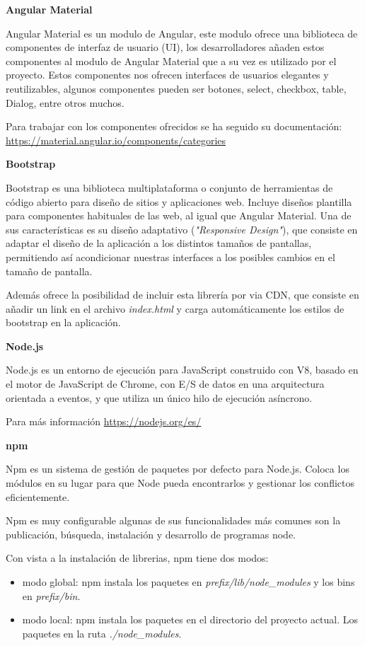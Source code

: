 \textbf{Angular Material}

Angular Material es un modulo de Angular, este modulo ofrece una biblioteca de componentes de interfaz de usuario (UI), los desarrolladores añaden estos componentes al modulo de Angular Material que a su vez es utilizado por el proyecto. Estos componentes nos  ofrecen interfaces de usuarios elegantes  y reutilizables, algunos componentes pueden ser botones, select, checkbox, table, Dialog, entre otros muchos.

Para trabajar con los componentes ofrecidos se ha seguido su documentación: \url{https://material.angular.io/components/categories}

\textbf{Bootstrap}

Bootstrap es una biblioteca multiplataforma o conjunto de herramientas de código abierto  para diseño de sitios y aplicaciones web. Incluye diseños plantilla para componentes habituales de las web, al igual que Angular Material. Una de sus características es su diseño adaptativo (\textit{"Responsive Design"}), que consiste en adaptar el diseño  de la aplicación a los distintos tamaños  de pantallas, permitiendo así acondicionar nuestras interfaces a los posibles cambios en el tamaño de pantalla.

Además ofrece la posibilidad de incluir esta librería por via CDN, que consiste en añadir un link en el archivo \textit{index.html} y carga automáticamente los estilos de bootstrap en la aplicación.


\textbf{Node.js}

Node.js es un entorno de ejecución para JavaScript construido con V8, basado en el motor de JavaScript de Chrome, con E/S de datos en una arquitectura orientada a eventos, y que utiliza un único hilo de ejecución asíncrono.

Para más información \url{https://nodejs.org/es/}

\textbf{npm}

Npm es un sistema de gestión de paquetes por defecto para Node.js. Coloca los módulos en su lugar para que Node pueda encontrarlos y gestionar los conflictos eficientemente.

Npm es muy configurable algunas de sus funcionalidades más comunes son la publicación, búsqueda, instalación y desarrollo de programas  node.

Con vista a la instalación de librerias, npm tiene dos modos: 
\begin{itemize}
	\item modo  global: npm instala los paquetes en \textit{prefix/lib/node\_modules} y los bins en \textit{prefix/bin}.
	\item modo local: npm instala los paquetes en el directorio del proyecto actual. Los paquetes en la ruta \textit{./node\_modules}.
\end{itemize}

